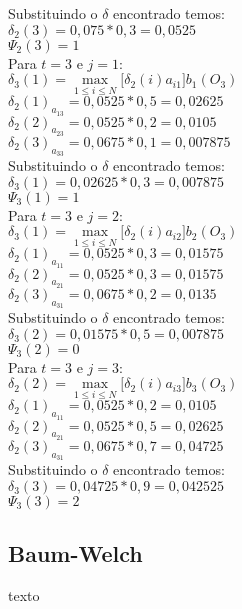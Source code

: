 \begin{multicols}{2}
 Substituindo o $\delta$ encontrado temos:\\
$\delta_2(3) = 0,075 * 0,3 = 0,0525$\\ 
$\Psi_2(3) = 1$\\

Para $t=3$ e $j = 1$:\\
$\displaystyle \delta_3 (1) = \max\limits_{1 \leq i \leq N} \Big[\delta_{2}(i) a_{i1} \Big]b_1 (O_3)$\\
$\delta_2(1)_{a_{13}} = 0,0525 * 0,5 = 0,02625$\\
$\delta_2(2)_{a_{23}} = 0,0525 * 0,2 = 0,0105$\\ 
$\delta_2(3)_{a_{33}} = 0,0675 * 0,1 = 0,007875$\\

Substituindo o $\delta$ encontrado temos:\\
$\delta_3(1) = 0,02625 * 0,3 = 0,007875$\\ 
 $\Psi_3(1) = 1$\\

Para $t=3$ e $j = 2$:\\
$\displaystyle \delta_3 (1) = \max\limits_{1 \leq i \leq N} \Big[\delta_{2}(i) a_{i2} \Big]b_2 (O_3)$\\
$\delta_2(1)_{a_{11}} = 0,0525 * 0,3 = 0,01575$\\
$\delta_2(2)_{a_{21}} = 0,0525 * 0,3 = 0,01575$\\
$\delta_2(3)_{a_{31}} = 0,0675 * 0,2 = 0,0135$\\
 
Substituindo o $\delta$ encontrado temos:\\
 $\delta_3(2) = 0,01575 * 0,5 = 0,007875$\\
$\Psi_3(2) = 0$\\

Para $t=3$ e $j = 3$:\\
$\displaystyle \delta_2 (2) = \max\limits_{1 \leq i \leq N} \Big[\delta_{2}(i) a_{i3} \Big]b_3 (O_3)$\\
$\delta_2(1)_{a_{11}} = 0,0525 * 0,2 = 0,0105$\\
$\delta_2(2)_{a_{21}} = 0,0525 * 0,5 = 0,02625$\\ 
$\delta_2(3)_{a_{31}} = 0,0675 * 0,7 = 0,04725$\\ 

 Substituindo o $\delta$ encontrado temos:\\
$\delta_3(3) = 0,04725 * 0,9 = 0,042525$\\
$\Psi_3(3) = 2$\\

\end{multicols}




\subsection{Baum-Welch}
\label{secBW}
texto








